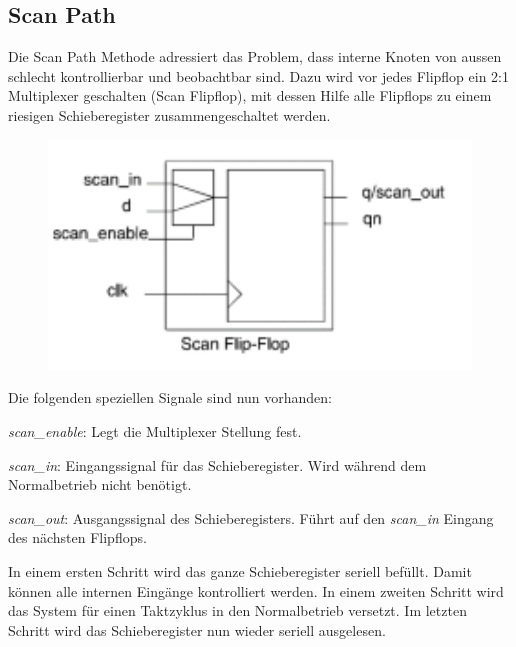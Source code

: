 \subsection{Scan Path}
Die Scan Path Methode adressiert das Problem, dass interne Knoten von aussen schlecht kontrollierbar und beobachtbar sind. Dazu wird vor jedes Flipflop ein 2:1 Multiplexer geschalten (Scan Flipflop), mit dessen Hilfe alle Flipflops zu einem riesigen Schieberegister zusammengeschaltet werden. \\
\begin{minipage}{0.25\textwidth}
\begin{figure}[H]
    \includegraphics[width=1.0\textwidth]{images/scanflipflop.png}
\end{figure}
\end{minipage}
\hfill
\begin{minipage}{0.7\textwidth}
Die folgenden speziellen Signale sind nun vorhanden:
\begin{compactitem}
    \item \textit{scan\_enable}: Legt die Multiplexer Stellung fest.
    \item \textit{scan\_in}: Eingangssignal für das Schieberegister. Wird während dem Normalbetrieb nicht benötigt.
    \item \textit{scan\_out}: Ausgangssignal des Schieberegisters. Führt auf den \textit{scan\_in} Eingang des nächsten Flipflops.
\end{compactitem}
\end{minipage}

In einem ersten Schritt wird das ganze Schieberegister seriell befüllt. Damit können alle internen Eingänge kontrolliert werden. In einem zweiten Schritt wird das System für einen Taktzyklus in den Normalbetrieb versetzt. Im letzten Schritt wird das Schieberegister nun wieder seriell ausgelesen.

